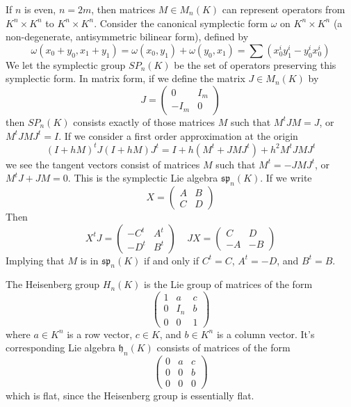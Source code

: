\begin{example}
    If $n$ is even, $n = 2m$, then matrices $M \in M_n(K)$ can represent operators from $K^n \times K^n$ to $K^n \times K^n$. Consider the canonical symplectic form $\omega$ on $K^n \times K^n$ (a non-degenerate, antisymmetric bilinear form), defined by
    \[ \omega(x_0 + y_0, x_1 + y_1) = \omega(x_0,y_1) + \omega(y_0,x_1) = \sum (x_0^i y_1^i - y_0^i x_0^i) \]
    We let the symplectic group $SP_n(K)$ be the set of operators preserving this symplectic form. In matrix form, if we define the matrix $J \in M_n(K)$ by
    \[ J = \begin{pmatrix} 0 & I_m \\ -I_m & 0 \end{pmatrix} \]
    then $SP_n(K)$ consists exactly of those matrices $M$ such that $M^tJM = J$, or $M^tJMJ^t = I$. If we consider a first order approximation at the origin
    \[ (I + hM)^tJ(I + hM)J^t = I + h(M^t + JMJ^t) + h^2M^tJMJ^t \]
    we see the tangent vectors consist of matrices $M$ such that $M^t = -JMJ^t$, or $M^tJ + JM = 0$. This is the symplectic Lie algebra $\mathfrak{sp}_n(K)$. If we write
    \[ X = \begin{pmatrix} A & B \\ C & D \end{pmatrix} \]
    Then
    \[ X^tJ = \begin{pmatrix} -C^t & A^t \\ -D^t & B^t \end{pmatrix}\ \ \ \ \ JX = \begin{pmatrix} C & D \\ -A & -B \end{pmatrix} \]
    Implying that $M$ is in $\mathfrak{sp}_n(K)$ if and only if $C^t = C$, $A^t= -D$, and $B^t = B$.
\end{example}

\begin{example}
    The Heisenberg group $H_n(K)$ is the Lie group of matrices of the form
    \[ \begin{pmatrix} 1 & a & c \\ 0 & I_n & b \\ 0 & 0 & 1 \end{pmatrix} \]
    where $a \in K^n$ is a row vector, $c \in K$, and $b \in K^n$ is a column vector. It's corresponding Lie algebra $\mathfrak{h}_n(K)$ consists of matrices of the form
    \[ \begin{pmatrix} 0 & a & c \\ 0 & 0 & b \\ 0 & 0 & 0 \end{pmatrix} \]
    which is flat, since the Heisenberg group is essentially flat.
\end{example}

